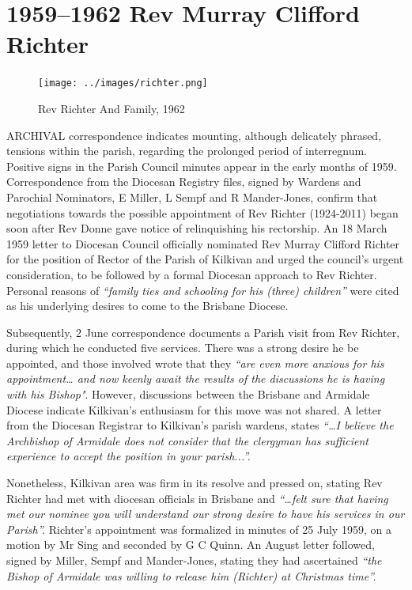 \printendnotes[custom]
\setcounter{endnote}{0}
\chapter{1959--1962 Rev Murray Clifford Richter}
\nobalance








\begin{figure}
\begin{center}
\texttt{[image: ../images/richter.png]}
\caption{Rev Richter And Family, 1962}
\end{center}
\end{figure}




\lettrine[lines=3]{A}{RCHIVAL}
 correspondence indicates mounting, although delicately phrased, tensions within the parish, regarding the prolonged period of interregnum. Positive signs in the Parish Council minutes appear in the early months of 1959. Correspondence from the Diocesan Registry files, signed by Wardens and Parochial Nominators, E Miller, L Sempf and R Mander-Jones, confirm that negotiations towards the possible appointment of Rev Richter (1924-2011) began soon after Rev Donne gave notice of relinquishing his rectorship. An 18 March 1959 letter to Diocesan Council officially nominated Rev Murray Clifford Richter for the position of Rector of the Parish of Kilkivan and urged the council's urgent consideration, to be followed by a formal Diocesan approach to Rev Richter. Personal reasons of \emph{``family ties and schooling for his (three) children''} were cited as his underlying desires to come to the Brisbane Diocese.

Subsequently, 2 June correspondence documents a Parish visit from Rev Richter, during which he conducted five services. There was a strong desire he be appointed, and those involved wrote that they \emph{``are even more anxious for his appointment\ldots{} and now keenly await the results of the discussions he is having with his Bishop"}. However, discussions between the Brisbane and Armidale Diocese indicate Kilkivan's enthusiasm for this move was not shared. A letter from the Diocesan Registrar to Kilkivan's parish wardens, states \emph{``\ldots I believe the Archbishop of Armidale does not consider that the clergyman has sufficient experience to accept the position in your parish...''.}



Nonetheless, Kilkivan area was firm in its resolve and pressed on, stating Rev Richter had met with diocesan officials in Brisbane and \emph{``\ldots felt sure that having met our nominee you will understand our strong desire to have his services in our Parish''.} Richter's appointment was formalized in minutes of 25 July 1959, on a motion by Mr Sing and seconded by G C Quinn. An August letter followed, signed by Miller, Sempf and Mander-Jones, stating they had ascertained \emph{``the Bishop of Armidale was willing to release him (Richter) at Christmas time''.}



